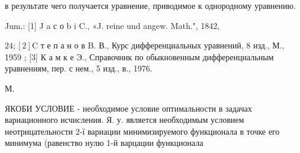 \documentclass[10pt]{article}
\begin{document}
в результате чего получается уравнение, приводимое к однородному уравнению.



Jum.: [1] J a с о b i C., «J. reine und angew. Math.", 1842,

$24 ;[2] \mathrm{C}$ т е п а н о в B. В., Курс дифференциальных уравнений, 8 изд., М., 1959 ; [3] К а м к е Э., Справочник по обыкновенным дифференциальным уравнениям, пер. с нем., 5 изд., в., 1976.

М.



ЯКОБИ УСЛОВИЕ - необходимое условие оптимальности в задачах вариационного исчисления. Я. у. является необходимым условием неотрицательности 2-ї вариации минимизируемого функционала в точке его минимума (равенство нулю 1-й варцации функционала
\end{document}
